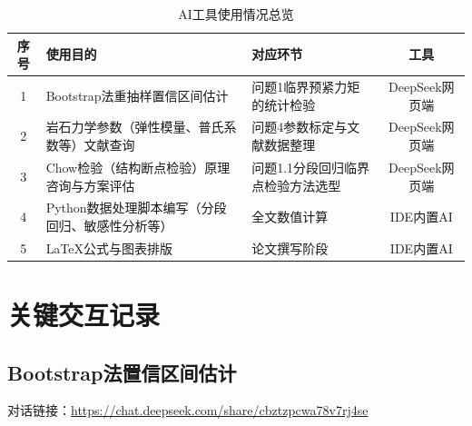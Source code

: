 \documentclass[12pt,a4paper]{article}
\begin{document}
\begin{table}[H]
\centering
\caption{AI工具使用情况总览}
\label{tab:ai-usage}
\renewcommand{\arraystretch}{1.3}
\begin{tabular}{|c|p{5.5cm}|p{5.5cm}|c|}
\hline
\textbf{序号} & \textbf{使用目的} & \textbf{对应环节} & \textbf{工具} \\
\hline
1 & Bootstrap法重抽样置信区间估计 & 问题1临界预紧力矩的统计检验 & DeepSeek网页端 \\
\hline
2 & 岩石力学参数（弹性模量、普氏系数等）文献查询 & 问题4参数标定与文献数据整理 & DeepSeek网页端 \\
\hline
3 & Chow检验（结构断点检验）原理咨询与方案评估 & 问题1.1分段回归临界点检验方法选型 & DeepSeek网页端 \\
\hline
4 & Python数据处理脚本编写（分段回归、敏感性分析等） & 全文数值计算 & IDE内置AI \\
\hline
5 & LaTeX公式与图表排版 & 论文撰写阶段 & IDE内置AI \\
\hline
\end{tabular}
\end{table}

\section{关键交互记录}

\subsection{Bootstrap法置信区间估计}

对话链接：\url{https://chat.deepseek.com/share/cbztzpcwa78v7rj4se}
\end{document}
